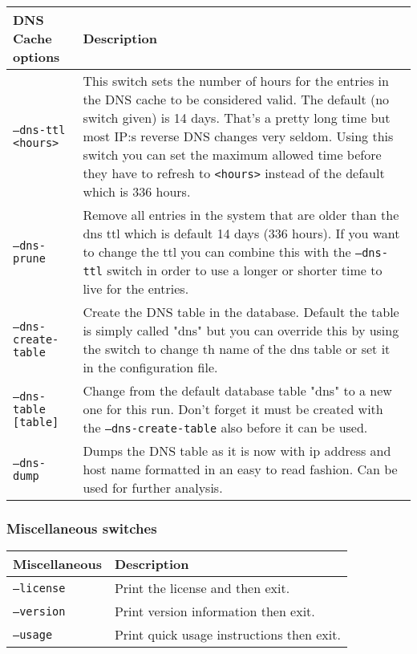 \documentclass[english,twoside,openright,a4paper,12pt]{article}
\begin{document}
\scriptsize
\begin{longtable}{|p{}|p{}|}
\hline
\textbf{DNS Cache options} & \textbf{Description}\\ \hline
	
\texttt{--dns-ttl <hours>} & This switch sets the number of hours for
the entries in the DNS cache to be considered valid. The default (no
switch given) is 14 days. That's a pretty long time but most IP:s
reverse DNS changes very seldom. Using this switch you can set the
maximum allowed time before they have to refresh to \texttt{<hours>}
instead of the default which is 336 hours. \\\hline

\texttt{--dns-prune} & Remove all entries in the system that are older
than the dns ttl which is default 14 days (336 hours). If you want to
change the ttl you can combine this with the \texttt{--dns-ttl} switch
in order to use a longer or shorter time to live for the entries.
\\\hline

\texttt{--dns-create-table} & Create the DNS table in the database.
Default the table is simply called "dns" but you can override this by
using the switch to change th name of the dns table or set it in the
configuration file. \\\hline

\texttt{--dns-table [table]} & Change from the default database table
"dns" to a new one for this run. Don't forget it must be created with
the \texttt{--dns-create-table} also before it can be used. \\\hline

\texttt{--dns-dump} & Dumps the DNS table as it is now with ip address
and host name formatted in an easy to read fashion. Can be used for
further analysis.\\\hline

\end{longtable}
\normalsize

\subsubsection{Miscellaneous switches}

\scriptsize
\begin{longtable}{|p{}|p{}|}
\hline
\textbf{Miscellaneous} & \textbf{Description}\\ \hline

\texttt{--license} &
Print the license and then exit.\\\hline

\texttt{--version} &
Print version information then exit.\\\hline

\texttt{--usage} &
Print quick usage instructions then exit.\\\hline

\end{longtable}
\normalsize
\end{document}
